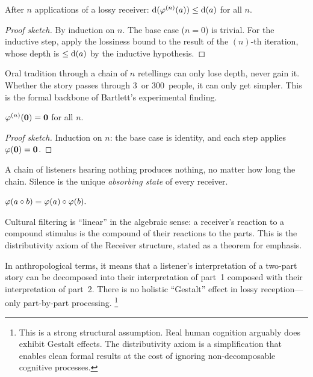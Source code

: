\begin{theorem}
\label{thm:iterated-lossy-depth}
After $n$ applications of a lossy receiver:
$\operatorname{d}(\varphi^{(n)}(a)) \le \operatorname{d}(a)$ for all $n$.
\end{theorem}

\begin{proof}[Proof sketch]
By induction on $n$.  The base case ($n=0$) is trivial.  For the inductive
step, apply the lossiness bound to the result of the $(n)$-th iteration,
whose depth is $\le\operatorname{d}(a)$ by the inductive hypothesis.
\end{proof}

Oral tradition through a chain of $n$ retellings can only lose depth, never
gain it.  Whether the story passes through 3~or 300~people, it can only get
simpler.  This is the formal backbone of Bartlett's experimental finding.

\begin{theorem}
\label{thm:iterated-void-stable}
$\varphi^{(n)}(\mathbf{0}) = \mathbf{0}$ for all $n$.
\end{theorem}

\begin{proof}[Proof sketch]
Induction on $n$: the base case is identity, and each step applies
$\varphi(\mathbf{0})=\mathbf{0}$.
\end{proof}

A chain of listeners hearing nothing produces nothing, no matter how long
the chain.  Silence is the unique \emph{absorbing state} of every receiver.

\begin{theorem}
\label{thm:lossy-distribute}
$\varphi(a\circ b) = \varphi(a)\circ\varphi(b).$
\end{theorem}

Cultural filtering is ``linear'' in the algebraic sense: a receiver's
reaction to a compound stimulus is the compound of their reactions to the
parts.  This is the distributivity axiom of the Receiver structure, stated
as a theorem for emphasis.

In anthropological terms, it means that a listener's interpretation of a
two-part story can be decomposed into their interpretation of part~1 composed
with their interpretation of part~2.  There is no holistic ``Gestalt'' effect
in lossy reception---only part-by-part processing.%
\footnote{This is a strong structural assumption.  Real human cognition
arguably does exhibit Gestalt effects.  The distributivity axiom is a
simplification that enables clean formal results at the cost of ignoring
non-decomposable cognitive processes.}


